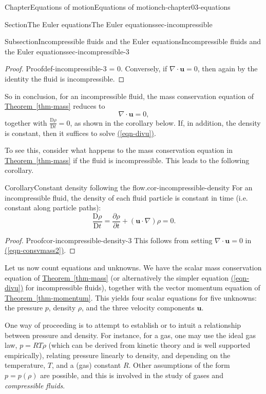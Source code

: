 \documentclass[oneside,10pt,]{book}
\newcommand{\xreffont}{\relax}
\numberwithin{equation}{section}
\newcommand{\DD}[2]{\frac{\mathrm{D}#1}{\mathrm{D}#2}}
\newcommand{\pd}[2]{\frac{\partial#1}{\partial#2}}
\newcommand{\bu}{\boldsymbol{u}}
\begin{document}
\begin{chapterptx}{Chapter}{Equations of motion}{}{Equations of motion}{}{}{ch-chapter03-equations}
\begin{sectionptx}{Section}{The Euler equations}{}{The Euler equations}{}{}{sec-incompressible}
\begin{subsectionptx}{Subsection}{Incompressible fluids and the Euler equations}{}{Incompressible fluids and the Euler equations}{}{}{sec-incompressible-3}
\begin{proof}{Proof}{}{def-incompressible-3}
\bu = 0.\) Conversely, if \(\nabla \cdot \bu = 0\), then again by the identity the fluid is incompressible.%
\end{proof}
So in conclusion, for an incompressible fluid, the mass conservation equation of \hyperref[thm-mass]{Theorem~{\xreffont\ref{thm-mass}}} reduces to%
\begin{equation}
\nabla \cdot \bu = 0,\label{eqn-divu}
\end{equation}
together with \(\DD{\rho}{t} = 0\), as shown in the corollary below. If, in addition, the density is constant, then it suffices to solve \hyperref[eqn-divu]{({\xreffont\ref{eqn-divu}})}.%
\par
To see this, consider what happens to the mass conservation equation in \hyperref[thm-mass]{Theorem~{\xreffont\ref{thm-mass}}} if the fluid is incompressible. This leads to the following corollary.%
\begin{corollary}{Corollary}{Constant density following the flow.}{}{cor-incompressible-density}%
For an incompressible fluid, the density of each fluid particle is constant in time (i.e. constant along particle paths):%
\begin{equation*}
\DD{\rho}{t} = \pd{\rho}{t} + (\bu \cdot \nabla)\rho = 0.
\end{equation*}
%
\end{corollary}
\begin{proof}{Proof}{}{cor-incompressible-density-3}
This follows from setting \(\nabla \cdot \bu = 0\) in \hyperref[eqn-consvmass2]{({\xreffont\ref{eqn-consvmass2}})}.%
\end{proof}
Let us now count equations and unknowns. We have the scalar mass conservation equation of \hyperref[thm-mass]{Theorem~{\xreffont\ref{thm-mass}}} (or alternatively the simpler equation \hyperref[eqn-divu]{({\xreffont\ref{eqn-divu}})} for incompressible fluids), together with the vector momentum equation of \hyperref[thm-momentum]{Theorem~{\xreffont\ref{thm-momentum}}}. This yields four scalar equations for five unknowns: the pressure \(p\), density \(\rho\), and the three velocity components \(\bu\).%
\par
One way of proceeding is to attempt to establish or to intuit a relationship between pressure and density. For instance, for a gas, one may use the ideal gas law, \(p =
RT\rho\) (which can be derived from kinetic theory and is well supported empirically), relating pressure linearly to density, and depending on the temperature, \(T\), and a (gas) constant \(R\). Other assumptions of the form \(p = p(\rho)\) are possible, and this is involved in the study of gases and \emph{compressible fluids}.%

\end{subsectionptx}
\end{sectionptx}
\end{chapterptx}
\end{document}
